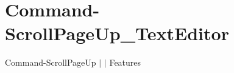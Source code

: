 \chapter{Command-\/\+Scroll\+Page\+Up\+\_\+\+Text\+Editor }
\hypertarget{md__docs_2_text_editor_2_features_2_command-_scroll_page_up___text_editor}{}\label{md__docs_2_text_editor_2_features_2_command-_scroll_page_up___text_editor}
Command-\/\+Scroll\+Page\+Up \texorpdfstring{$\vert$}{|}  \texorpdfstring{$\vert$}{|} Features



 